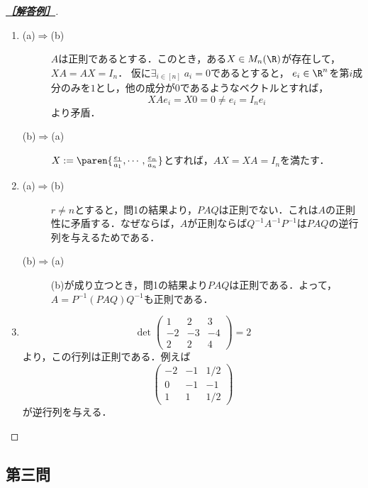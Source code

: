 \documentclass[uplatex,dvipdfmx]{jsarticle}
\begin{document}
\begin{proof}[\textbf{\underline{［解答例］}}]\mbox{}
    \begin{enumerate}
        \item \begin{description}
            \item[(a)$\Rightarrow$(b)] $A$は正則であるとする．このとき，ある$X\in M_n(\R)$が存在して，$XA=AX=I_n$．
            仮に$\exists_{i\in[n]}\;a_i=0$であるとすると，
            $e_i\in\R^n$を第$i$成分のみを$1$とし，他の成分が$0$であるようなベクトルとすれば，
            \[XAe_i=X0=0\ne e_i=I_ne_i\]
            より矛盾．
            \item[(b)$\Rightarrow$(a)] $X:=\paren{\frac{e_1}{a_1},\cdots,\frac{e_n}{a_n}}$とすれば，$AX=XA=I_n$を満たす．
        \end{description}
        \item \begin{description}
            \item[(a)$\Rightarrow$(b)] $r\ne n$とすると，問1の結果より，$PAQ$は正則でない．これは$A$の正則性に矛盾する．なぜならば，$A$が正則ならば$Q^{-1}A^{-1}P^{-1}$は$PAQ$の逆行列を与えるためである．
            \item[(b)$\Rightarrow$(a)] (b)が成り立つとき，問1の結果より$PAQ$は正則である．よって，$A=P^{-1}(PAQ)Q^{-1}$も正則である．
        \end{description}
        \item \[\det\begin{pmatrix}1&2&3\\-2&-3&-4\\2&2&4\end{pmatrix}=2\]
        より，この行列は正則である．例えば
        \[\begin{pmatrix}-2&-1&1/2\\0&-1&-1\\1&1&1/2\end{pmatrix}\]
        が逆行列を与える．
    \end{enumerate}
\end{proof}

\subsection{第三問}
\end{document}
